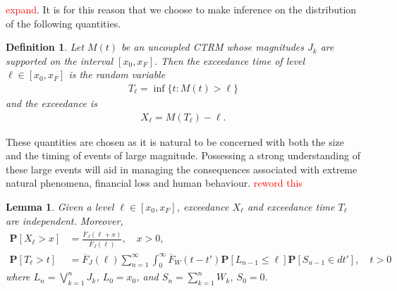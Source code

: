 \documentclass[honours,12pt]{UNSWthesis}
\newcommand{\pr}{\mathbf {P}}
\newcommand{\1}{\mathbf 1}
\newtheorem{lemma}[theorem]{Lemma}
\newtheorem{definition}[theorem]{Definition}
\numberwithin{equation}{section}
\theoremstyle{definition}
\theoremstyle{remark}
\begin{document}
\textcolor{red}{expand}. It is for this reason that we choose to make inference on the distribution of the following quantities.\\
\begin{definition}
Let $M(t)$ be an uncoupled CTRM whose magnitudes $J_k$ are supported on the interval
$[x_0, x_F]$.  Then the exceedance time of level $\ell \in [x_0,x_F]$ is
the random variable
\begin{align*}
T_\ell = \inf\{t: M(t) > \ell\}
\end{align*}
and the exceedance is 
\begin{align*}
X_\ell = M(T_\ell) - \ell.
\end{align*}
\end{definition}
These quantities are chosen as it is natural to be concerned with both the size and the timing of events of large magnitude. Possessing a strong understanding of these large events will aid in managing the consequences associated with extreme natural phenomena, financial loss and human behaviour. \textcolor{red}{reword this}
\begin{lemma}
Given a level $\ell \in [x_0,x_F]$, exceedance $X_\ell$ and exceedance time
$T_\ell$ are independent. Moreover, 
\begin{align*}
\pr[X_\ell > x]
&= \frac{\overline F_J(\ell + x)}{\overline F_J(\ell)}, \quad x > 0,
\\
\pr[T_\ell > t]
&= \overline F_J(\ell) \sum_{n=1}^\infty \int_0^\infty \overline F_W(t-t') \pr[L_{n-1} \le \ell]
\pr[S_{n-1} \in dt'], \quad t > 0
\end{align*}
where $L_n = \bigvee_{k=1}^n J_k$, $L_0 = x_0$, and $S_n = \sum_{k=1}^n W_k$,
$S_0 = 0$.
\end{lemma}
\end{document}
